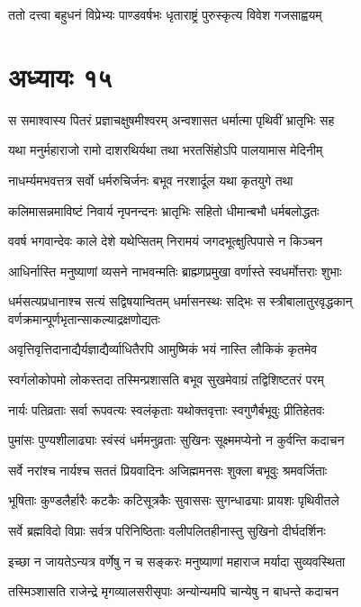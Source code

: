 \twolineshloka
{ततो दत्त्वा बहुधनं विप्रेभ्यः पाण्डवर्षभः}
{धृताराष्ट्रं पुरुस्कृत्य विवेश गजसाह्वयम्}


\chapter{अध्यायः १५}
\twolineshloka
{स समाश्वास्य पितरं प्रज्ञाचक्षुषमीश्वरम्}
{अन्वशासत धर्मात्मा पृथिवीं भ्रातृभिः सह}


\twolineshloka
{यथा मनुर्महाराजो रामो दाशरथिर्यथा}
{तथा भरतसिंहोऽपि पालयामास मेदिनीम्}


\twolineshloka
{नाधर्म्यमभवत्तत्र सर्वो धर्मरुचिर्जनः}
{बभूव नरशार्दूल यथा कृतयुगे तथा}


\twolineshloka
{कलिमासन्नमाविष्टं निवार्य नृपनन्दनः}
{भ्रातृभिः सहितो धीमान्बभौ धर्मबलोद्धतः}


\twolineshloka
{ववर्ष भगवान्देवः काले देशे यथेप्सितम्}
{निरामयं जगदभूत्क्षुत्पिपासे न किञ्चन}


\twolineshloka
{आधिर्नास्ति मनुष्याणां व्यसने नाभवन्मतिः}
{ब्राह्म्णप्रमुखा वर्णास्ते स्वधर्मोत्तराः शुभाः}


\threelineshloka
{धर्मसत्यप्रधानाश्च सत्यं सद्विषयान्वितम्}
{धर्मासनस्थः सद्भिः स स्त्रीबालातुरवृद्धकान्}
{वर्णक्रमान्पूर्णभृतान्साकल्याद्रक्षणोद्यतः}


\twolineshloka
{अवृत्तिवृत्तिदानाद्यैर्यज्ञाद्यैर्व्याधितैरपि}
{आमुष्मिकं भयं नास्ति लौकिकं कृतमेव}


\twolineshloka
{स्वर्गलोकोपमो लोकस्तदा तस्मिन्प्रशासति}
{बभूव सुखमेवाग्रं तद्विशिष्टतरं परम्}


\twolineshloka
{नार्यः पतिव्रताः सर्वा रूपवत्यः स्वलंकृताः}
{यथोक्तवृत्ताः स्वगुणैर्बभूवुः प्रीतिहेतवः}


\twolineshloka
{पुमांसः पुण्यशीलाढ्याः स्वंस्वं धर्ममनुव्रताः}
{सुखिनः सूक्ष्ममप्येनो न कुर्वन्ति कदाचन}


\twolineshloka
{सर्वे नरांश्च नार्यश्च सततं प्रियवादिनः}
{अजिह्ममनसः शुक्ला बभूवुः श्रमवर्जिताः}


\twolineshloka
{भूषिताः कुण्डलैर्हारैः कटकैः कटिसूत्रकैः}
{सुवाससः सुगन्धाढ्याः प्रायशः पृथिवीतले}


\twolineshloka
{सर्वे ब्रह्मविदो विप्राः सर्वत्र परिनिष्ठिताः}
{वलीपलितहीनास्तु सुखिनो दीर्घदर्शिनः}


\twolineshloka
{इच्छा न जायतेऽन्यत्र वर्णेषु न च सङ्करः}
{मनुष्याणां महाराज मर्यादा सुव्यवस्थिता}


\twolineshloka
{तस्मिञ्शासति राजेन्द्रे मृगव्यालसरीसृपाः}
{अन्योन्यमपि चान्येषु न बाधन्ते कदाचन}


